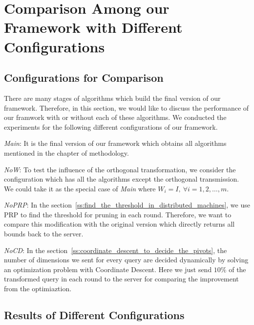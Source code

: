 


\section{Comparison Among our Framework with Different Configurations} %
\label{s:comparison_among_our_framework_with_different_configurations}


\subsection{Configurations for Comparison} %
\label{sub:configurations_for_comparison}

There are many stages of algorithms which build the final version of our framework.  Therefore, in this section, we would like to discuss the performance of our framwork with or without each of these algorithms.  We conducted the experiments for the following different configurations of our framework.

\emph{Main}: It is the final version of our framework which obtains all algorithms mentioned in the chapter of methodology.

\emph{NoW}: To test the influence of the orthogonal transformation, we consider the configuration which has all the algorithms except the orthogonal transmission.  We could take it as the special case of \emph{Main} where $W_i=I,~\forall i=1,2,\ldots,m$.

\emph{NoPRP}: In the section~\ref{ss:find_the_threshold_in_distributed_machines}, we use PRP to find the threshold for pruning in each round.  Therefore, we want to compare this modification with the original version which directly returns all bounds back to the server.

\emph{NoCD}: In the section~\ref{ss:coordinate_descent_to_decide_the_pivots}, the number of dimensions we sent for every query are decided dynamically by solving an optimization problem with Coordinate Descent.  Here we just send $10\%$ of the transformed query in each round to the server for comparing the improvement from the optimiaztion.


\subsection{Results of Different Configurations} %
\label{sub:results_of_different_configurations}


